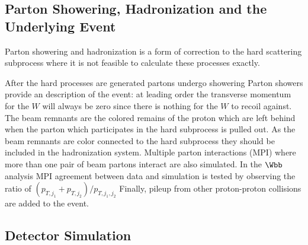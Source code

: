 \subsection{Parton Showering, Hadronization and the Underlying Event}

Parton showering and hadronization is a form of correction to the hard scattering subprocess
where it is not feasible to calculate these processes exactly.

After the hard processes are generated
partons undergo showering 
Parton showers provide an %
description of the event: at leading order the transverse momentum
for the $W$ will always be zero since there is nothing for the $W$
to recoil against.
The beam remnants are the colored remains of the proton which
are left behind when the parton which participates in the hard subprocess
is pulled out. As the beam remnants are color connected to the hard
subprocess they should be included in the hadronization system. 
Multiple parton interactions (MPI) where more than one pair
of beam partons interact are also simulated. In the $\Wbb$ analysis
MPI agreement between data and simulation is tested 
by observing the ratio of $(p_{T,j_{1}}+p_{T,j_{2}})/p_{T,j_{1},j_{2}}$
Finally, pileup from other proton-proton collisions are added to the event.

\subsection{Detector Simulation}
